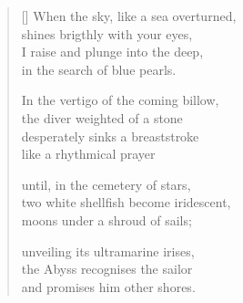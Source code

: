 \documentclass[12pt,a4paper]{article}
\begin{document}
\thispagestyle{empty}


\settowidth{\versewidth}{two white shellfish become iridescent,}

\bigskip

\begin{verse}[\versewidth]
  When the sky, like a sea overturned, \\
  shines brigthly with your eyes, \\
  I raise and plunge into the deep, \\
  in the search of blue pearls.

  In the vertigo of the coming billow, \\
  the diver weighted of a stone \\
  desperately sinks a breaststroke \\
  like a rhythmical prayer

  until, in the cemetery of stars, \\
  two white shellfish become iridescent, \\
  moons under a shroud of sails;

  unveiling its ultramarine irises, \\
  the Abyss recognises the sailor \\
  and promises him other shores.
\end{verse}
\end{document}
